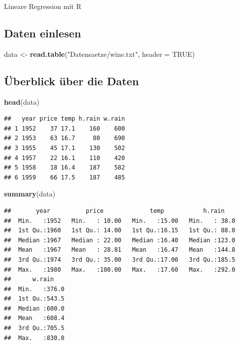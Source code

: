\documentclass[]{article}
\newenvironment{Shaded}{\begin{snugshade}}{\end{snugshade}}
\newcommand{\DataTypeTok}[1]{\textcolor[rgb]{0.13,0.29,0.53}{#1}}
\newcommand{\KeywordTok}[1]{\textcolor[rgb]{0.13,0.29,0.53}{\textbf{#1}}}
\newcommand{\NormalTok}[1]{#1}
\newcommand{\OtherTok}[1]{\textcolor[rgb]{0.56,0.35,0.01}{#1}}
\newcommand{\StringTok}[1]{\textcolor[rgb]{0.31,0.60,0.02}{#1}}
\begin{document}
Lineare Regression mit R

\hypertarget{daten-einlesen}{%
\subsection{Daten einlesen}\label{daten-einlesen}}

\begin{Shaded}
\begin{Highlighting}[]
\NormalTok{data <-}\StringTok{ }\KeywordTok{read.table}\NormalTok{(}\StringTok{"Datensaetze/wine.txt"}\NormalTok{, }\DataTypeTok{header =} \OtherTok{TRUE}\NormalTok{)}
\end{Highlighting}
\end{Shaded}

\hypertarget{uxfcberblick-uxfcber-die-daten}{%
\subsection{Überblick über die Daten}\label{uxfcberblick-uxfcber-die-daten}}

\begin{Shaded}
\begin{Highlighting}[]
\KeywordTok{head}\NormalTok{(data)}
\end{Highlighting}
\end{Shaded}

\begin{verbatim}
##   year price temp h.rain w.rain
## 1 1952    37 17.1    160    600
## 2 1953    63 16.7     80    690
## 3 1955    45 17.1    130    502
## 4 1957    22 16.1    110    420
## 5 1958    18 16.4    187    582
## 6 1959    66 17.5    187    485
\end{verbatim}

\begin{Shaded}
\begin{Highlighting}[]
\KeywordTok{summary}\NormalTok{(data)}
\end{Highlighting}
\end{Shaded}

\begin{verbatim}
##       year          price             temp           h.rain     
##  Min.   :1952   Min.   : 10.00   Min.   :15.00   Min.   : 38.0  
##  1st Qu.:1960   1st Qu.: 14.00   1st Qu.:16.15   1st Qu.: 88.0  
##  Median :1967   Median : 22.00   Median :16.40   Median :123.0  
##  Mean   :1967   Mean   : 28.81   Mean   :16.47   Mean   :144.8  
##  3rd Qu.:1974   3rd Qu.: 35.00   3rd Qu.:17.00   3rd Qu.:185.5  
##  Max.   :1980   Max.   :100.00   Max.   :17.60   Max.   :292.0  
##      w.rain     
##  Min.   :376.0  
##  1st Qu.:543.5  
##  Median :600.0  
##  Mean   :608.4  
##  3rd Qu.:705.5  
##  Max.   :830.0
\end{verbatim}
\end{document}
